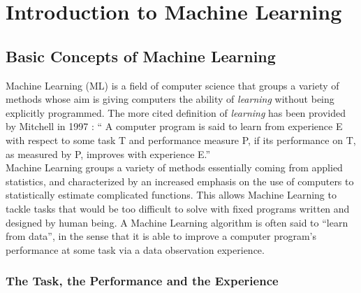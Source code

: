 
\chapter{Introduction to Machine Learning} %

\label{ChapterIntroML}


\section{Basic Concepts of Machine Learning}
Machine Learning (ML) is a field of computer science that groups a variety of  methods whose aim is giving computers the ability of \emph{learning} without being explicitly programmed. The more cited definition of \emph{learning} has been provided by Mitchell in 1997 \cite{Mitchell1997}: \enquote{ A computer program is said to learn from experience E with respect to some task T and performance measure P, if its performance on T, as measured by P, improves with experience E.} \\
Machine Learning groups a variety of methods essentially coming from applied statistics, and characterized by an increased emphasis on the use of computers to statistically estimate complicated functions. This allows Machine Learning to tackle tasks that would be too difficult to solve with fixed programs written and designed by human being. A Machine Learning algorithm is often said to \enquote{learn from data}, in the sense that it is able to improve a computer program's performance at some task via a data observation experience.

\subsection{The Task, the Performance and the Experience}
